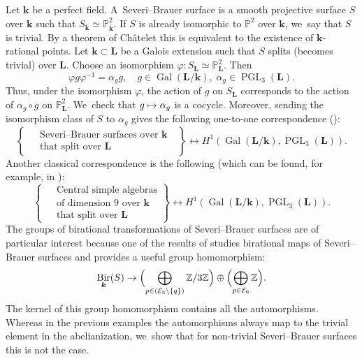 \documentclass[JEP,XML,SOM,Unicode,NoFloatCountersInSection, NoEqCountersInSection,published]{cedram}
\newcommand\mto{\mathchoice{\longmapsto}{\mapsto}{\mapsto}{\mapsto}}
\DeclareMathOperator{\Gal}{Gal}
\theoremstyle{definition}
\newcommand{\kk}{{\boldsymbol{k}}}
\newcommand{\LL}{{\boldsymbol{L}}}
\DeclareMathOperator{\PGL}{PGL}
\DeclareMathOperator{\Bir}{Bir}
\begin{document}
Let $\kk$ be a perfect field. A~Severi--Brauer surface is a smooth projective surface $S$ over $\kk$ such that $S_{\bar{\kk}} \simeq \mathbb{P}^2_{\bar{\kk}}$. If $S$ is already isomorphic to $\mathbb{P}^2$ over $\kk$, we~say that $S$ is trivial. By a theorem of Châtelet this is equivalent to the existence of $\kk$-rational points. Let $\kk \subset \LL$ be a Galois extension such that $S$ splits (becomes trivial) over $\LL$. Choose an isomorphism $\varphi\colon S_{\LL} \simeq \mathbb{P}^2_{\LL}$. Then
\[
\varphi g \varphi^{-1} = \alpha_g g,\quad g \in \Gal(\LL/\kk), \;\alpha_g \in \PGL_3(\LL).
\]
Thus, under the isomorphism $\varphi$, the action of $g$ on $S_{\LL}$ corresponds to the action of $\alpha_g \circ g$ on $\mathbb{P}^2_{\LL}$. We~check that $g \mto \alpha_g$ is a cocycle. Moreover, sending the isomorphism class of $S$ to $\alpha_g$ gives the following one-to-one correspondence (\cite[I\S 5, III\S 1]{serre1997galois}):
\[
\left \{ \begin{aligned} & \text{ Severi--Brauer surfaces over~$\kk$ } \\[
-3pt] & \text{ that split over $\LL$ } \end{aligned} \right \} \longleftrightarrow H^1(\Gal(\LL/ \kk), \PGL_3(\LL)).
\]
Another classical correspondence is the following (which can be found, for example, in \cite[X\S 5]{serre2004corps}):
\[
\left \{ \begin{aligned} & \text{ Central simple algebras} \\[
-3pt] & \text{ of dimension 9 over~$\kk$ }\\[
-3pt]& \text{ that split over $\LL$ } \end{aligned} \right \} \longleftrightarrow H^1(\Gal(\LL/ \kk), \PGL_3(\LL)).
\]
The groups of birational transformations of Severi--Brauer surfaces are of particular interest because one of the results of \cite{BSY} studies birational maps of Severi--Brauer surfaces and provides a useful group homomorphism:
\[
\Bir_{\kk}(S) \to \Bigl (\bigoplus_{p \in (\mathcal{E}_3 \setminus \{ q \})} \mathbb{Z}/3\mathbb{Z} \Bigr) \oplus \Bigl (\bigoplus_{p \in \mathcal{E}_6} \mathbb{Z} \Bigr).
\]
The kernel of this group homomorphism contains all the automorphisms. Whereas in the previous examples the automorphisms always map to the trivial element in the abelianization, we~show that for non-trivial Severi--Brauer surfaces this is not the case.
\end{document}
